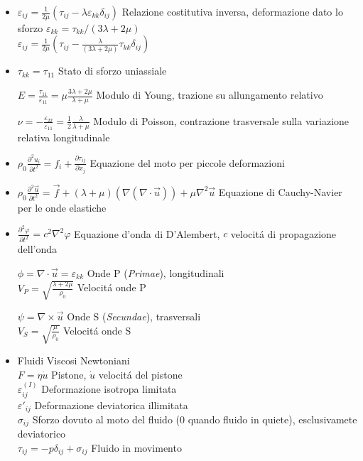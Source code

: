 \documentclass[a4paper]{article}
\begin{document}
\begin{itemize}
	\item $\varepsilon_{ij}=\frac{1}{2 \mu} (\tau_{ij}-\lambda \varepsilon_{kk} \delta_{ij})$ Relazione costitutiva inversa, deformazione dato lo sforzo	
	$\varepsilon_{kk}=\tau_{kk}/(3\lambda+2\mu)$\\
	$\varepsilon_{ij}=\frac{1}{2 \mu} (\tau_{ij}-  \frac{\lambda }{(3\lambda+2\mu)} \tau_{kk} \delta_{ij})$
	
	\item $\tau_{kk}=\tau_{11}$ Stato di sforzo uniassiale
	
	$E=\frac{\tau_{11}}{\varepsilon_{11}}=\mu \frac{3\lambda + 2\mu}{\lambda + \mu}$ Modulo di Young, trazione su allungamento relativo
	
	$\nu=-\frac{\varepsilon_{22}}{\varepsilon_{11}}=\frac{1}{2}\frac{\lambda}{\lambda+ \mu}$ Modulo di Poisson, contrazione trasversale sulla variazione relativa longitudinale
	
	\item $\rho_0 \frac{\partial^2 u_i}{\partial t^2} =f_i+ \frac{\partial \tau_{ij}}{\partial x_j} $ Equazione del moto per piccole deformazioni
	
	\item $\rho_0 \frac{\partial^2 \overrightarrow{u}}{\partial t^2} = \overrightarrow{f}+ (\lambda+\mu) (\nabla(\nabla \cdot \overrightarrow{u}))+\mu \nabla^2 \overrightarrow{u} $ Equazione di Cauchy-Navier per le onde elastiche
	
	\item $\frac{\partial^2 \varphi}{\partial t^2}=c^2 \nabla^2 \varphi$ Equazione d'onda di D'Alembert, $c$ velocit\'a di propagazione dell'onda
	
	$\phi=\nabla \cdot \overrightarrow{u} = \varepsilon_{kk}$ Onde P (\textit{Primae}), longitudinali\\
	$V_P= \sqrt{\frac{\lambda+2\mu}{\rho_0}}$ Velocit\'a onde P
	
	$\psi = \nabla \times \overrightarrow{u}$ Onde S (\textit{Secundae}), trasversali\\
	$V_S = \sqrt{\frac{\mu}{\rho_0}}$ Velocit\'a onde S
	
	\item Fluidi  Viscosi Newtoniani\\
	$F = \eta \dot{u}$ Pistone, $\dot{u}$ velocit\'a del pistone\\
	$\varepsilon^{(I)}_{ij}$ Deformazione isotropa limitata\\
	$\varepsilon'_{ij}$ Deformazione deviatorica illimitata\\
	$\sigma_{ij}$ Sforzo dovuto al moto del fluido (0 quando fluido in quiete), esclusivamete deviatorico\\
	$\tau_{ij}=-p \delta_{ij}+\sigma_{ij}$ Fluido in movimento
	

\end{itemize}
\end{document}
